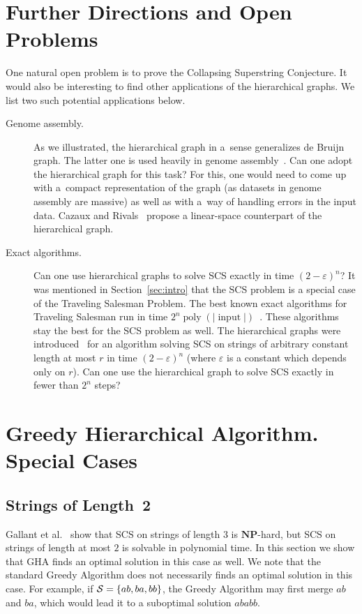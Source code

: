 \documentclass[11pt]{article}
\DeclareMathOperator{\poly}{poly}
\DeclareMathOperator{\inp}{input}
\begin{document}
\section{Further Directions and Open Problems}
One natural open problem is to prove the Collapsing Superstring Conjecture.
It would also be interesting to find other applications of the 
hierarchical graphs. We list two such potential applications below.
\begin{description}
\item[Genome assembly.] As we illustrated, the hierarchical graph in a~sense
generalizes de Bruijn graph. The latter one is used heavily 
in genome assembly~\cite{pevzner2001eulerian}.
Can one adopt the hierarchical graph for this task? For this, one
would need to come up with a~compact representation of the graph
(as datasets in genome assembly are massive) as well as with a~way of
handling errors in the input data. Cazaux and Rivals~\cite{cazaux2018hierarchical} propose a linear-space counterpart of the hierarchical graph.

\item[Exact algorithms.] Can one use hierarchical graphs to solve SCS exactly in time $(2-\varepsilon)^n$?
It was mentioned in Section~\ref{sec:intro} that the SCS problem is a special case of the Traveling Salesman Problem. The best known exact algorithms for Traveling Salesman run in time $2^n \poly(|\inp|)$~\cite{B1962, HK1971, KGK1977, K1982, BF1996}. These algorithms stay the best for the SCS problem as well. The hierarchical graphs were introduced~\cite{scs_exact} for an algorithm solving SCS on strings of arbitrary constant length at most $r$ in time $(2-\varepsilon)^n$ (where $\varepsilon$ is a constant which depends only on $r$). Can one use the hierarchical graph to solve SCS exactly in fewer than $2^n$ steps?
\end{description}




\appendix
\section{Greedy Hierarchical Algorithm. Special Cases}
\label{app:a}
\subsection{Strings of Length~2}
Gallant et al.~\cite{GMS1980} show that SCS on strings of length $3$ is $\mathbf{NP}$-hard, but SCS on strings of length at most $2$ is solvable in polynomial time. In this section we show that GHA finds an optimal solution in this case as well. We note that the standard Greedy Algorithm does not necessarily finds an optimal solution in this case. For example, if ${\cal S}=\{ab, ba, bb\}$, the Greedy Algorithm may first merge $ab$ and $ba$, which would lead it to a suboptimal solution $ababb$. 
\end{document}
